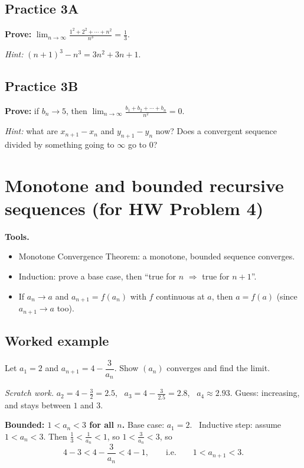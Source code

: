\documentclass[11pt]{article}
\begin{document}
\subsection*{Practice 3A}
\textbf{Prove:}
$\displaystyle\lim_{n\to\infty}\frac{1^2+2^2+\cdots+n^2}{n^3}=\frac13$.

\emph{Hint:} $(n+1)^3-n^3 = 3n^2+3n+1$.

\vspace{3cm}

\subsection*{Practice 3B}
\textbf{Prove:} if $b_n\to 5$, then
$\displaystyle\lim_{n\to\infty}\frac{b_1+b_2+\cdots+b_n}{n^2}=0$.

\emph{Hint:} what are $x_{n+1}-x_n$ and $y_{n+1}-y_n$ now? Does a
convergent sequence divided by something going to $\infty$ go to $0$?

\vspace{3cm}

\newpage
\section{Monotone and bounded recursive sequences \quad (for HW Problem 4)}

\textbf{Tools.}
\begin{itemize}
  \item Monotone Convergence Theorem: a monotone, bounded sequence converges.
  \item Induction: prove a base case, then ``true for $n$ $\Rightarrow$ true for $n+1$''.
  \item If $a_n\to a$ and $a_{n+1}=f(a_n)$ with $f$ continuous at $a$, then
        $a=f(a)$ (since $a_{n+1}\to a$ too).
\end{itemize}

\subsection*{Worked example}
Let $a_1=2$ and $a_{n+1}=4-\dfrac{3}{a_n}$. Show $(a_n)$ converges and find
the limit.

\emph{Scratch work.} $a_2 = 4-\tfrac32 = 2.5$, \ $a_3 = 4-\tfrac{3}{2.5}=2.8$,
\ $a_4\approx 2.93$. Guess: increasing, and stays between $1$ and $3$.

\textbf{Bounded: $1<a_n<3$ for all $n$.} Base case: $a_1=2$. \ Inductive step:
assume $1<a_n<3$. Then $\tfrac13<\tfrac1{a_n}<1$, so $1<\tfrac3{a_n}<3$, so
\[
  4-3 < 4-\frac3{a_n} < 4-1,\qquad\text{i.e.}\qquad 1<a_{n+1}<3 .
\]
\end{document}
